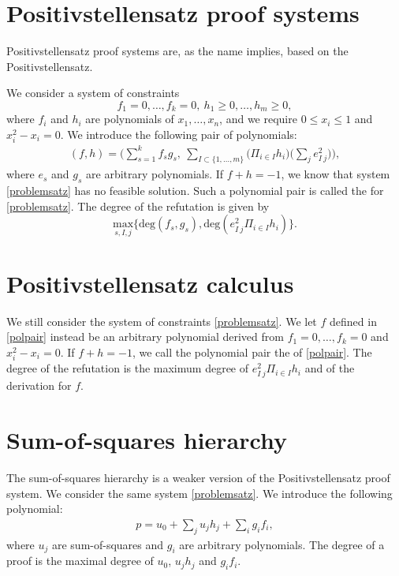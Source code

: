\documentclass[a4paper,twoside,justified]{tufte-handout}
\begin{document}
\section{Positivstellensatz proof systems\cite{grigoriev2001complexity}}
Positivstellensatz proof systems are, as the name implies, based on the Positivstellensatz\cite{bochnak1987satz}. 

We consider a system of constraints
\begin{equation}
\label{problemsatz}
f_1=0,\ldots,f_k=0,\ h_1\geq0,\ldots,h_m\geq0,
\end{equation}
where $f_i$ and $h_i$ are polynomials of $x_1,\ldots,x_n$, and we require $0\leq x_i \leq 1$ and $x_i^2-x_i=0$. We introduce the following pair of polynomials:
\begin{eqnarray}
\label{polpair}
(f,h)=\bigg(\sum_{s=1}^kf_sg_s,\ \sum_{I\subset\{1,\ldots,m\}}\big(\Pi_{i\in I}h_i\big)\big(\sum_je^2_{I\ j}\big)\bigg),
\end{eqnarray}
where $e_s$ and $g_s$ are arbitrary polynomials. If $f+h=-1$, we know that system \eqref{problemsatz} has no feasible solution. Such a polynomial pair is called the  for \eqref{problemsatz}. The degree of the refutation is given by
\begin{equation}
\label{degreesatz}
\underset{s,I,j}{\text{max}}\{\text{deg}(f_s,g_s),\text{deg}(e^2_{I\ j}\Pi_{i\in I}h_i)\}.
\end{equation} 

\section{Positivstellensatz calculus\cite{grigoriev2001complexity}}
We still consider the system of constraints \eqref{problemsatz}. We let $f$ defined in \eqref{polpair} instead be an arbitrary polynomial derived from $f_1=0,\ldots,f_k=0$ and $x_i^2-x_i=0$. If $f+h=-1$, we call the polynomial pair the  of \eqref{polpair}. The degree of the refutation is the maximum degree of $e^2_{I\ j}\Pi_{i\in I}h_i$ and of the derivation for $f$.

\section{Sum-of-squares hierarchy}
 The sum-of-squares hierarchy is a weaker version of the Positivstellensatz proof system. We consider the same system \eqref{problemsatz}. We introduce the following polynomial:
\begin{eqnarray}
\label{polsos}
p=u_0+\sum_{j}u_jh_j+\sum_ig_if_i,
\end{eqnarray}
 where $u_j$ are sum-of-squares and $g_i$ are arbitrary polynomials. The degree of a proof is the maximal degree of $u_0$, $u_jh_j$ and $g_if_i$.
\end{document}
